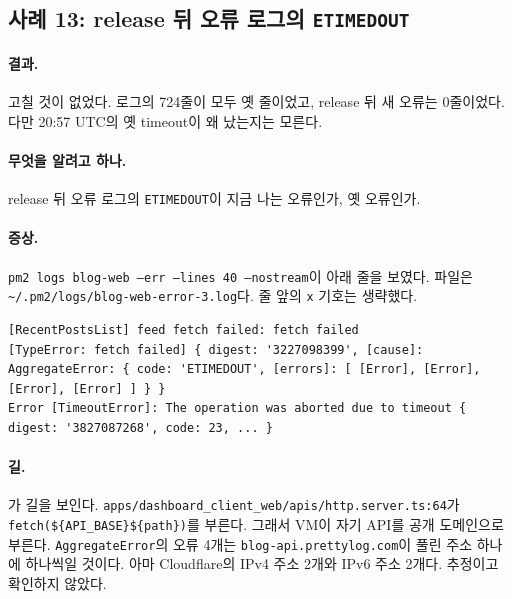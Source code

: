 \subsection{사례 13: release 뒤 오류 로그의 \texttt{ETIMEDOUT}}\label{sec:dbg-case13}

\paragraph{결과.}
고칠 것이 없었다.
로그의 724줄이 모두 옛 줄이었고, release 뒤 새 오류는 0줄이었다.
다만 20:57 UTC의 옛 timeout이 왜 났는지는 모른다.

\paragraph{무엇을 알려고 하나.}
release 뒤 오류 로그의 \texttt{ETIMEDOUT}이 지금 나는 오류인가, 옛 오류인가.

\paragraph{증상.}
\texttt{pm2 logs blog-web --err --lines 40 --nostream}이 아래 줄을 보였다.
파일은 \texttt{\textasciitilde/.pm2/logs/blog-web-error-3.log}다.
줄 앞의 \texttt{x} 기호는 생략했다.

\begin{lstlisting}[language={}]
[RecentPostsList] feed fetch failed: fetch failed
[TypeError: fetch failed] { digest: '3227098399', [cause]: AggregateError: { code: 'ETIMEDOUT', [errors]: [ [Error], [Error], [Error], [Error] ] } }
Error [TimeoutError]: The operation was aborted due to timeout { digest: '3827087268', code: 23, ... }
\end{lstlisting}

\paragraph{길.}
가 길을 보인다.
\texttt{apps/dashboard\_client\_web/apis/http.server.ts:64}가 \texttt{fetch(\$\{API\_BASE\}\$\{path\})}를 부른다.
그래서 VM이 자기 API를 공개 도메인으로 부른다.
\texttt{AggregateError}의 오류 4개는 \texttt{blog-api.prettylog.com}이 풀린 주소 하나에 하나씩일 것이다. 아마 Cloudflare의 IPv4 주소 2개와 IPv6 주소 2개다. 추정이고 확인하지 않았다.

